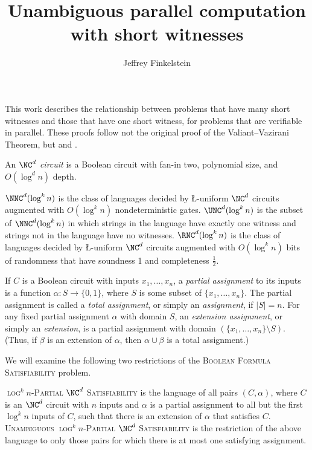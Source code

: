 \documentclass{article}
\title{Unambiguous parallel computation with short witnesses}
\author{Jeffrey Finkelstein}
\newcommand{\PSAT}{\textsc{$\log^k n$-Partial $\NC^d$ Satisfiability}}
\newcommand{\UPSAT}{\textsc{Unambiguous $\log^k n$-Partial $\NC^d$ Satisfiability}}
\begin{document}
\maketitle

This work describes the relationship between problems that have many short witnesses and those that have one short witness, for problems that are verifiable in parallel.
These proofs follow not the original proof of the Valiant--Vazirani Theorem, but \cite{trevisan10} and \cite{ab09}.

\begin{definition}
  An \emph{$\NC^d$ circuit} is a Boolean circuit with fan-in two, polynomial size, and $O(\log^d n)$ depth.
\end{definition}

\begin{definition}
  $\NNC^d(\log^k n)$ is the class of languages decided by \L-uniform $\NC^d$ circuits augmented with $O(\log^k n)$ nondeterministic gates.
  $\UNC^d(\log^k n)$ is the subset of $\NNC^d(\log^k n)$ in which strings in the language have exactly one witness and strings not in the language have no witnesses.
  $\RNC^d(\log^k n)$ is the class of languages decided by \L-uniform $\NC^d$ circuits augmented with $O(\log^k n)$ bits of randomness that have soundness 1 and completeness $\frac{1}{2}$.
\end{definition}

\begin{definition}
  If $C$ is a Boolean circuit with inputs $x_1, \dotsc, x_n$, a \emph{partial assignment} to its inputs is a function $\alpha \colon S \to \{0, 1\}$, where $S$ is some subset of $\{x_1, \dotsc, x_n\}$.
  The partial assignment is called a \emph{total assignment}, or simply an \emph{assignment}, if $|S| = n$.
  For any fixed partial assignment $\alpha$ with domain $S$, an \emph{extension assignment}, or simply an \emph{extension}, is a partial assignment with domain $(\{x_1, \dotsc, x_n\} \setminus S)$.
  (Thus, if $\beta$ is an extension of $\alpha$, then $\alpha \cup \beta$ is a total assignment.)
\end{definition}

We will examine the following two restrictions of the \textsc{Boolean Formula Satisfiability} problem.

\begin{definition}
  \PSAT{} is the language of all pairs $(C, \alpha)$, where $C$ is an $\NC^d$ circuit with $n$ inputs and $\alpha$ is a partial assignment to all but the first $\log^k n$ inputs of $C$, such that there is an extension of $\alpha$ that satisfies $C$.
  \UPSAT{} is the restriction of the above language to only those pairs for which there is at most one satisfying assignment.
\end{definition}
\end{document}
